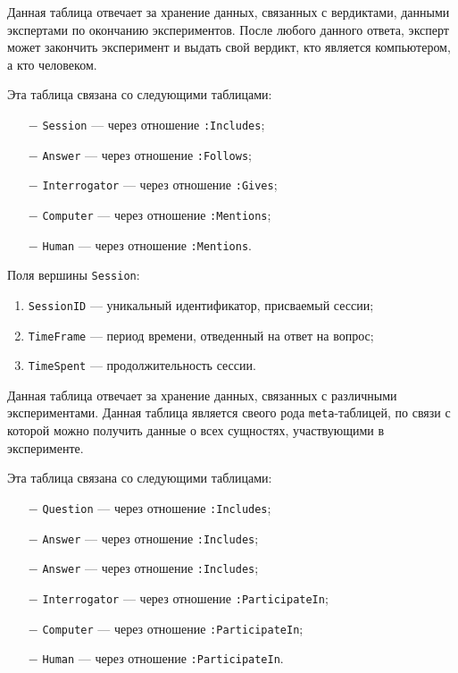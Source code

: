 Данная таблица отвечает за хранение данных, связанных с вердиктами, данными экспертами по окончанию экспериментов.
После любого данного ответа, эксперт может закончить эксперимент и выдать свой вердикт, кто является компьютером, а кто человеком.

Эта таблица связана со следующими таблицами:
\begin{itemize}
    \item[$-$] \texttt{Session} --- через отношение \texttt{:Includes};
    \item[$-$] \texttt{Answer} --- через отношение \texttt{:Follows};
    \item[$-$] \texttt{Interrogator} --- через отношение \texttt{:Gives};
    \item[$-$] \texttt{Computer} --- через отношение \texttt{:Mentions};
    \item[$-$] \texttt{Human} --- через отношение \texttt{:Mentions}.
\end{itemize}

Поля вершины \texttt{Session}:
\begin{enumerate}
    \item \texttt{SessionID} --- уникальный идентификатор, присваемый сессии;
    \item \texttt{TimeFrame} --- период времени, отведенный на ответ на вопрос;
    \item \texttt{TimeSpent} --- продолжительность сессии.
\end{enumerate}

Данная таблица отвечает за хранение данных, связанных с различными экспериментами.
Данная таблица является свеого рода \texttt{meta}-таблицей, по связи с которой можно получить данные о всех сущностях, участвующими в эксперименте.

Эта таблица связана со следующими таблицами:
\begin{itemize}
    \item[$-$] \texttt{Question} --- через отношение \texttt{:Includes};
    \item[$-$] \texttt{Answer} --- через отношение \texttt{:Includes};
    \item[$-$] \texttt{Answer} --- через отношение \texttt{:Includes};
    \item[$-$] \texttt{Interrogator} --- через отношение \texttt{:ParticipateIn};
    \item[$-$] \texttt{Computer} --- через отношение \texttt{:ParticipateIn};
    \item[$-$] \texttt{Human} --- через отношение \texttt{:ParticipateIn}.
\end{itemize}

